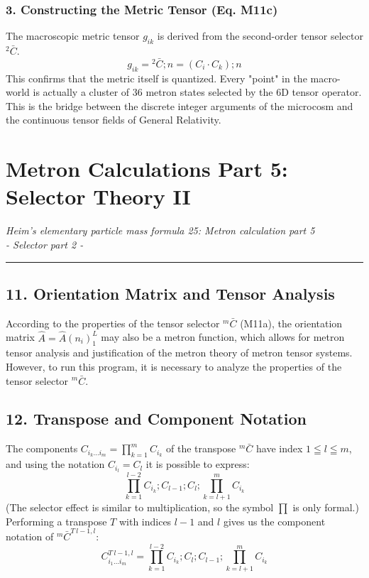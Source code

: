 \documentclass[11pt,a4paper,oneside]{article}
\newcommand{\hr}{\par\vspace{2em}\noindent\rule{\linewidth}{0.4pt}\par\vspace{2em}}
\begin{document}
\subsubsection*{3. Constructing the Metric Tensor (Eq. M11c)}
The macroscopic metric tensor $g_{ik}$ is derived from the second-order tensor selector ${}^2 \bar{C}$.
\begin{equation}
    g_{ik} = {}^2 \bar{C}; n = (C_i \cdot C_k); n
\end{equation}
This confirms that the metric itself is quantized. Every "point" in the macro-world is actually a cluster of 36 metron states selected by the 6D tensor operator. This is the bridge between the discrete integer arguments of the microcosm and the continuous tensor fields of General Relativity. 
\section{Metron Calculations Part 5: Selector Theory II}
\textit{Heim's elementary particle mass formula 25: Metron calculation part 5 \\ - Selector part 2 -}

\hr

\subsection{11. Orientation Matrix and Tensor Analysis}
According to the properties of the tensor selector ${}^m \bar {C}$ (M11a), the orientation matrix $\hat {A} = \hat {A}(n_i)_1^L$ may also be a metron function, which allows for metron tensor analysis and justification of the metron theory of metron tensor systems. However, to run this program, it is necessary to analyze the properties of the tensor selector ${}^m \bar {C}$.

\subsection{12. Transpose and Component Notation}
The components $C_{i_k ... i_m} = \prod_{k = 1} ^m C_{i_k}$ of the transpose ${}^m \bar {C}$ have index $1 \leqq l \leqq m$, and using the notation $C_{i_l} = C_{l}$ it is possible to express:
\begin{equation*}
\prod_{k = 1}^{l-2} C_{i_k}; C_{l-1}; C_{l}; \prod_{ k = l + 1}^m C_{i_k}
\end{equation*}
(The selector effect is similar to multiplication, so the symbol $\prod$ is only formal.) Performing a transpose $T$ with indices $l-1$ and $l$ gives us the component notation of ${}^m \bar {C}^{T\ l-1,l}$:
\begin{equation*}
C_{i_1 ... i_m}^{T\ l-1,l} = \prod_{k = 1}^{l-2} C_{i_k};C_{l};C_{l-1}; \prod_{k = l + 1}^m C_{i_k}
\end{equation*}
\end{document}
